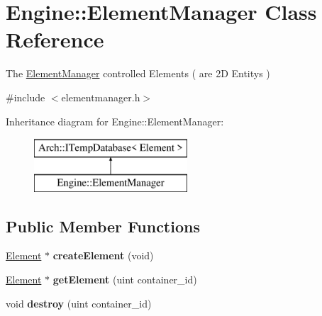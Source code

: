 \hypertarget{classEngine_1_1ElementManager}{}\section{Engine\+:\+:Element\+Manager Class Reference}
\label{classEngine_1_1ElementManager}


The \hyperlink{classEngine_1_1ElementManager}{Element\+Manager} controlled Elements ( are 2\+D Entitys )  




{\ttfamily \#include $<$elementmanager.\+h$>$}

Inheritance diagram for Engine\+:\+:Element\+Manager\+:\begin{figure}[H]
\begin{center}
\leavevmode
\includegraphics[height=2.000000cm]{classEngine_1_1ElementManager}
\end{center}
\end{figure}
\subsection*{Public Member Functions}
\begin{DoxyCompactItemize}
\item 
\hypertarget{classEngine_1_1ElementManager_ae5149303aa75cc787a4a48a46035c271}{}\hyperlink{classEngine_1_1Element}{Element} $\ast$ {\bfseries create\+Element} (void)\label{classEngine_1_1ElementManager_ae5149303aa75cc787a4a48a46035c271}

\item 
\hypertarget{classEngine_1_1ElementManager_a46404a987667a712fe45fbaf22637d8a}{}\hyperlink{classEngine_1_1Element}{Element} $\ast$ {\bfseries get\+Element} (uint container\+\_\+id)\label{classEngine_1_1ElementManager_a46404a987667a712fe45fbaf22637d8a}

\item 
\hypertarget{classEngine_1_1ElementManager_a2e6e82cca8c3c71c93619cf7c4e15e63}{}void {\bfseries destroy} (uint container\+\_\+id)\label{classEngine_1_1ElementManager_a2e6e82cca8c3c71c93619cf7c4e15e63}

\end{DoxyCompactItemize}


